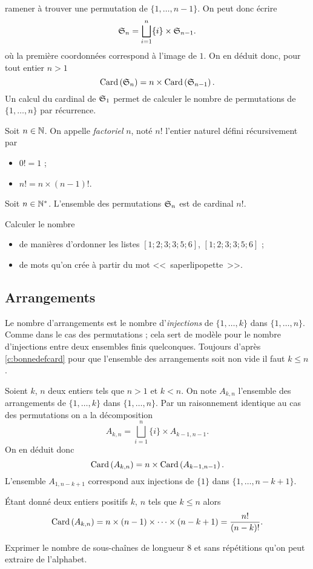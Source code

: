 \documentclass[12pt, a4paper]{article}
\begin{document}
ramener à trouver une permutation de $\{1, \ldots, n-1\}$. On peut
donc écrire
\[
  \mathfrak{S}_n = \bigsqcup_{i=1}^n \{i\}\times \mathfrak{S}_{n-1}.
\]
où la première coordonnées correspond à l'image de $1$. On en déduit
donc, pour tout entier $n > 1$
\[
  \mathrm{Card}\left(\mathfrak{S}_n\right) = n \times \mathrm{Card}\left(\mathfrak{S}_{n-1}\right).
\]
Un calcul du cardinal de $\mathfrak{S}_1$ permet de calculer le nombre de
permutations de $\{1, \ldots, n\}$ par récurrence.
\begin{defn}
  Soit $n \in \mathbb{N}$. On appelle \emph{factoriel} $n$, noté $n!$
  l'entier naturel défini récursivement par
  \begin{itemize}
  \item[\textbullet] $0! = 1$ ;
  \item[\textbullet] $n! = n \times (n-1)!$.
  \end{itemize}
\end{defn}
\begin{prop}
  Soit $n \in \mathbb{N}^*$. L'ensemble des permutations $\mathfrak{S}_n$ est de
  cardinal $n!$.
\end{prop}
\begin{question}
  Calculer le nombre
  \begin{itemize}
  \item de manières d'ordonner les listes $[1; 2; 3; 3; 5; 6]$,
    $[1; 2; 3; 3; 5; 6]$ ;
  \item de mots qu'on crée à partir du mot <<~saperlipopette~>>.
  \end{itemize}
\end{question}

\subsection{Arrangements}

Le nombre d'arrangements est le nombre d'\emph{injections} de
$\{1, \ldots, k\}$ dans $\{1, \ldots, n\}$. Comme dans le cas des
permutations ; cela sert de modèle pour le nombre d'injections entre
deux ensembles finis quelconques. Toujours d'après
\ref{c:bonnedefcard} pour que l'ensemble des arrangements soit non
vide il faut $k \leq n$.

Soient $k$, $n$ deux entiers tels que $n > 1$ et $k < n$. On note
$A_{k, n}$ l'ensemble des arrangements de $\{1, \ldots, k\}$ dans
$\{1, \ldots, n\}$. Par un raisonnement identique au cas des
permutations on a la décomposition
\[
  A_{k, n} = \bigsqcup_{i=1}^n \{i\}\times A_{k - 1, n-1}.
\]
On en déduit donc
\[
  \mathrm{Card}\left(A_{k, n}\right) = n\times \mathrm{Card}\left(A_{k - 1, n-1}\right).
\]
L'ensemble $A_{1, n - k + 1}$ correspond aux injections de $\{1\}$
dans $\{1, \ldots, n - k + 1\}$.
\begin{prop}
  Étant donné deux entiers positifs $k$, $n$ tels que $k \leq n$ alors
  \[
    \mathrm{Card}\left(A_{k, n}\right) = n\times (n-1) \times \cdots \times (n - k + 1) = \frac{n!}{(n-k)!}.
  \]
\end{prop}
\begin{question}
  Exprimer le nombre de sous-chaînes de longueur $8$ et sans
  répétitions qu'on peut extraire de l'alphabet.
\end{question}
\end{document}
